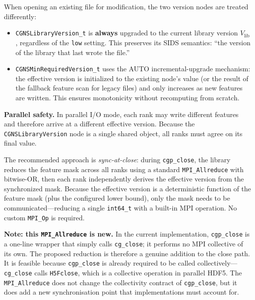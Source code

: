 \documentclass[11pt,letterpaper]{article}
\begin{document}
\begin{description}[leftmargin=2em]
\item[\texttt{CG\_MODE\_MODIFY} handling.]
  When opening an existing file for modification, the two version
  nodes are treated differently:
  \begin{itemize}[leftmargin=1.5em]
  \item \texttt{CGNSLibraryVersion\_t} is \textbf{always} upgraded to
    the current library version $V_{\mathrm{lib}}$, regardless of the
    \texttt{low} setting.  This preserves its SIDS semantics: ``the
    version of the library that last wrote the file.''
  \item \texttt{CGNSMinRequiredVersion\_t} uses the
    AUTO incremental-upgrade mechanism: the effective version is
    initialized to the existing node's value (or the result of the
    fallback feature scan for legacy files) and only increases as new
    features are written.  This ensures monotonicity without
    recomputing from scratch.
  \end{itemize}
\end{description}

\textbf{Parallel safety.}  In parallel I/O mode, each rank may write
different features and therefore arrive at a different effective
version.  Because the \texttt{CGNSLibraryVersion} node is a single
shared object, all ranks must agree on its final value.

The recommended approach is \emph{sync-at-close}: during
\texttt{cgp\_close}, the library reduces the feature mask across all
ranks using a standard \texttt{MPI\_Allreduce} with bitwise-OR, then
each rank independently derives the effective version from the
synchronized mask.  Because the effective version is a deterministic
function of the feature mask (plus the configured lower bound), only
the mask needs to be communicated---reducing a single
\texttt{int64\_t} with a built-in MPI operation.  No custom
\texttt{MPI\_Op} is required.

\textbf{Note: this \texttt{MPI\_Allreduce} is new.}  In the current
implementation, \texttt{cgp\_close} is a one-line wrapper that simply
calls \texttt{cg\_close}; it performs no MPI collective of its own.
The proposed reduction is therefore a genuine addition to the close
path.  It is feasible because \texttt{cgp\_close} is already required
to be called collectively---\texttt{cg\_close} calls
\texttt{H5Fclose}, which is a collective operation in parallel HDF5.
The \texttt{MPI\_Allreduce} does not change the collectivity contract
of \texttt{cgp\_close}, but it does add a new synchronisation point
that implementations must account for.
\end{document}
